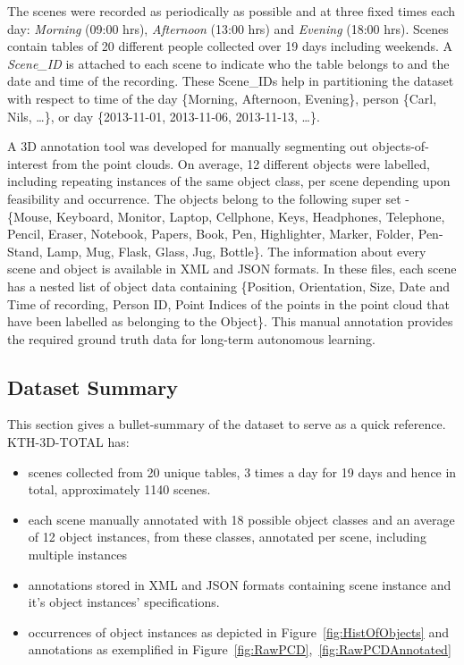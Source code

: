 \documentclass[letterpaper, 10 pt, conference]{ieeeconf}  %
\begin{document}
The scenes were recorded as periodically as possible and at three fixed times each day: \emph{Morning} (09:00 hrs), \emph{Afternoon} (13:00 
hrs) and \emph{Evening} (18:00 hrs). Scenes contain tables of 20 different people collected over 19 days including weekends. 
A \textit{Scene\_ID} is attached to each scene to indicate who the table belongs to and the date and time of the recording. These Scene\_IDs help in partitioning the dataset with respect to time of the day \{Morning, Afternoon, Evening\}, person \{Carl, Nils, \dots\}, or day \{2013-11-01, 2013-11-06, 2013-11-13, \dots\}.

A 3D annotation tool was developed for manually segmenting out objects-of-interest from the point clouds. On average, 12 different objects 
were labelled, including repeating instances of the same object class, per scene depending upon feasibility and occurrence. The objects 
belong to the following super set - \{Mouse, Keyboard, Monitor, Laptop, Cellphone, Keys, Headphones, Telephone, Pencil, Eraser, Notebook, 
Papers,  Book, Pen, Highlighter, Marker, Folder, Pen-Stand, Lamp, Mug, Flask, Glass, Jug, Bottle\}. The information about every scene and 
object is available in  XML and JSON formats. In these files, each scene has a nested list of object data containing \{Position, Orientation, Size, Date and 
Time of recording, Person ID, Point Indices of the points in the point cloud that have been labelled as belonging to the Object\}. This 
manual annotation provides the required ground truth data for long-term autonomous learning.

\subsection{Dataset Summary}
\label{ssec:Dataset Summary}
This section gives a bullet-summary of the dataset to serve as a quick reference.
\noindent KTH-3D-TOTAL has:
\begin{itemize}
	\item scenes collected from 20 unique tables, 3 times a day for 19 days and hence in total, approximately 1140 scenes.
	\item each scene manually annotated with 18 possible object classes and an average of 12 object instances, from these classes, annotated per scene, including multiple instances
	\item annotations stored in XML and JSON formats containing scene instance and it's object instances' specifications.
	\item occurrences of object instances as depicted in Figure~\ref{fig:HistOfObjects} and annotations as exemplified in Figure~\ref{fig:RawPCD},~\ref{fig:RawPCDAnnotated}
\end{itemize}
\end{document}

